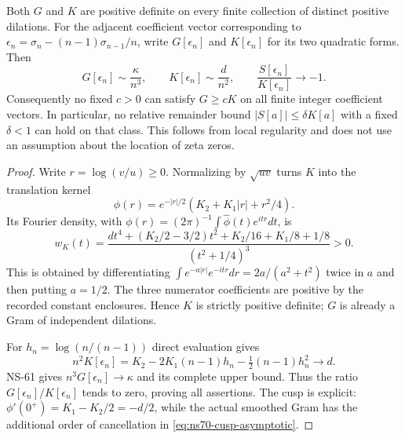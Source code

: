 \begin{proposition}
\label{prop:ns70-cusp}
Both $G$ and $K$ are positive definite on every finite collection of
distinct positive dilations. For the adjacent coefficient vector
corresponding to
$\epsilon_n=\sigma_n-(n-1)\sigma_{n-1}/n$, write $G[\epsilon_n]$
and $K[\epsilon_n]$ for its two quadratic forms. Then
\begin{equation}
 G[\epsilon_n]\sim\frac\kappa{n^3},\qquad
 K[\epsilon_n]\sim\frac d{n^2},\qquad
 \frac{S[\epsilon_n]}{K[\epsilon_n]}\longrightarrow-1.
 \label{eq:ns70-cusp-asymptotic}
\end{equation}
Consequently no fixed $c>0$ can satisfy $G\geq cK$ on all finite
integer coefficient vectors. In particular, no relative remainder
bound $|S[a]|\leq\delta K[a]$ with a fixed $\delta<1$ can hold
on that class. This follows from local regularity and does not use
an assumption about the location of zeta zeros.
\end{proposition}
\begin{proof}
Write $r=\log(v/u)\geq0$. Normalizing by $\sqrt{uv}$ turns $K$
into the translation kernel
\[
 \phi(r)=e^{-|r|/2}(K_2+K_1|r|+r^2/4).
\]
Its Fourier density, with
$\phi(r)=(2\pi)^{-1}\int\widehat\phi(t)e^{itr}dt$, is
\begin{equation}
 w_K(t)=\frac{d t^4+(K_2/2-3/2)t^2
                         +K_2/16+K_1/8+1/8}{(t^2+1/4)^3}>0.
 \label{eq:ns70-background-symbol}
\end{equation}
This is obtained by differentiating
$\int e^{-a|r|}e^{-itr}dr=2a/(a^2+t^2)$ twice in $a$ and then
putting $a=1/2$. The three numerator coefficients are positive by
the recorded constant enclosures. Hence $K$ is strictly positive
definite; $G$ is already a Gram of independent dilations.

For $h_n=\log(n/(n-1))$ direct evaluation gives
\begin{equation}
 n^2K[\epsilon_n]
 =K_2-2K_1(n-1)h_n-\tfrac12(n-1)h_n^2\longrightarrow d.
 \label{eq:ns70-exact-adjacent-background}
\end{equation}
NS-61 gives $n^3G[\epsilon_n]\to\kappa$ and its complete upper
bound. Thus the ratio $G[\epsilon_n]/K[\epsilon_n]$ tends to zero,
proving all assertions. The cusp is explicit:
$\phi'(0^+)=K_1-K_2/2=-d/2$, while the actual smoothed Gram
has the additional order of cancellation in
\eqref{eq:ns70-cusp-asymptotic}.
\end{proof}

